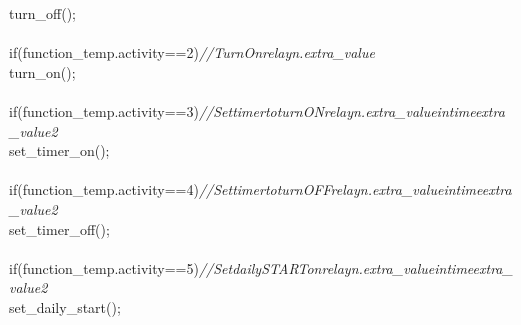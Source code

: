 \documentclass[a4paper, 12pt]{article}
\newcommand\SPC{\hspace*{0.6em}}
\newcommand\TAB{\hspace*{1.2em}}
\newcommand{\CppAComment}[1]{\textit{\textcolor[rgb]{0.2,0.4,1}{#1}}}
\newcommand{\CppAIdentifier}[1]{\textcolor[rgb]{0,1,0}{#1}}
\newcommand{\CppANumber}[1]{\textcolor[rgb]{0,0,1}{#1}}
\newcommand{\CppAReservedWord}[1]{\textcolor[rgb]{0,0.5,0}{#1}}
\newcommand{\CppASpace}[1]{\textcolor[rgb]{1,1,1}{\colorbox[rgb]{0,0,0}{#1}}}
\newcommand{\CppASymbol}[1]{\textcolor[rgb]{1,0,0}{#1}}
\begin{document}
\begin{ttfamily}
\CppASpace{\SPC \SPC \SPC \SPC \SPC \SPC }\CppAIdentifier{turn\_off}\CppASymbol{(}\CppASymbol{)}\CppASymbol{;}\\
\CppASpace{\SPC \SPC }\\
\CppASpace{\SPC \SPC }\CppAReservedWord{if}\CppASpace{\SPC }\CppASymbol{(}\CppAIdentifier{function\_temp}\CppASymbol{.}\CppAIdentifier{activity}\CppASpace{\SPC }\CppASymbol{==}\CppASpace{\SPC }\CppANumber{2}\CppASpace{\SPC }\CppASymbol{)}\CppASpace{\SPC }\CppAComment{//\SPC Turn\SPC On\SPC relay\SPC n.\SPC extra\_value}\\
\CppASpace{\SPC \SPC \SPC \SPC \SPC \SPC }\CppAIdentifier{turn\_on}\CppASymbol{(}\CppASymbol{)}\CppASymbol{;}\\
\\
\CppASpace{\SPC \SPC }\CppAReservedWord{if}\CppASpace{\SPC }\CppASymbol{(}\CppAIdentifier{function\_temp}\CppASymbol{.}\CppAIdentifier{activity}\CppASpace{\SPC }\CppASymbol{==}\CppASpace{\SPC }\CppANumber{3}\CppASpace{\SPC }\CppASymbol{)}\CppASpace{\SPC }\CppAComment{//\SPC Set\SPC timer\SPC to\SPC turn\SPC ON\SPC relay\SPC n.\SPC extra\_value\SPC in\SPC time\SPC extra\_value2}\\
\CppASpace{\TAB \SPC \SPC \SPC \SPC }\CppAIdentifier{set\_timer\_on}\CppASymbol{(}\CppASymbol{)}\CppASymbol{;}\\
\\
\CppASpace{\SPC \SPC }\CppAReservedWord{if}\CppASpace{\SPC }\CppASymbol{(}\CppAIdentifier{function\_temp}\CppASymbol{.}\CppAIdentifier{activity}\CppASpace{\SPC }\CppASymbol{==}\CppASpace{\SPC }\CppANumber{4}\CppASpace{\SPC }\CppASymbol{)}\CppASpace{\SPC }\CppAComment{//\SPC Set\SPC timer\SPC to\SPC turn\SPC OFF\SPC relay\SPC n.\SPC extra\_value\SPC in\SPC time\SPC extra\_value2}\\
\CppASpace{\SPC \SPC \SPC \SPC \SPC \SPC }\CppAIdentifier{set\_timer\_off}\CppASymbol{(}\CppASymbol{)}\CppASymbol{;}\\
\CppASpace{\SPC \SPC \SPC \SPC }\\
\CppASpace{\SPC \SPC }\CppAReservedWord{if}\CppASpace{\SPC }\CppASymbol{(}\CppAIdentifier{function\_temp}\CppASymbol{.}\CppAIdentifier{activity}\CppASpace{\SPC }\CppASymbol{==}\CppASpace{\SPC }\CppANumber{5}\CppASpace{\SPC }\CppASymbol{)}\CppASpace{\SPC }\CppAComment{//\SPC Set\SPC daily\SPC START\SPC on\SPC relay\SPC n.\SPC extra\_value\SPC in\SPC time\SPC extra\_value2}\\
\CppASpace{\SPC \SPC \SPC \SPC \SPC \SPC }\CppAIdentifier{set\_daily\_start}\CppASymbol{(}\CppASymbol{)}\CppASymbol{;}\\

\end{ttfamily}
\end{document}
